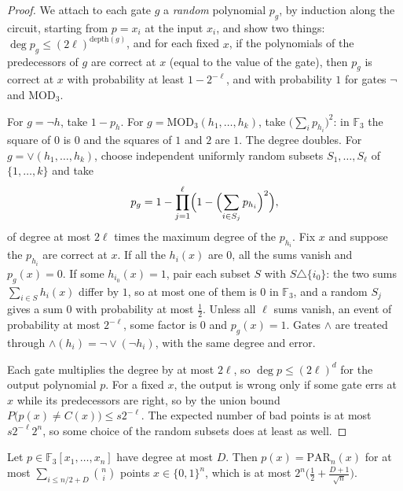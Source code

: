 \begin{proof}
We attach to each gate $g$ a \emph{random} polynomial $p_g$, by induction along the circuit, starting from $p=x_i$ at the input $x_i$, and show two things: $\deg p_g\le(2\ell)^{\mathrm{depth}(g)}$, and for each fixed $x$, if the polynomials of the predecessors of $g$ are correct at $x$ (equal to the value of the gate), then $p_g$ is correct at $x$ with probability at least $1-2^{-\ell}$, and with probability $1$ for gates $\lnot$ and $\mathrm{MOD}_3$.

For $g=\lnot h$, take $1-p_h$. For $g=\mathrm{MOD}_3(h_1,\dots,h_k)$, take $\bigl(\sum_ip_{h_i}\bigr)^2$: in $\mathbb F_3$ the square of $0$ is $0$ and the squares of $1$ and $2$ are $1$. The degree doubles. For $g=\lor(h_1,\dots,h_k)$, choose independent uniformly random subsets $S_1,\dots,S_\ell$ of $\{1,\dots,k\}$ and take
\[
p_g=1-\prod_{j=1}^{\ell}\Bigl(1-\Bigl(\sum_{i\in S_j}p_{h_i}\Bigr)^2\Bigr),
\]
of degree at most $2\ell$ times the maximum degree of the $p_{h_i}$. Fix $x$ and suppose the $p_{h_i}$ are correct at $x$. If all the $h_i(x)$ are $0$, all the sums vanish and $p_g(x)=0$. If some $h_{i_0}(x)=1$, pair each subset $S$ with $S\triangle\{i_0\}$: the two sums $\sum_{i\in S}h_i(x)$ differ by $1$, so at most one of them is $0$ in $\mathbb F_3$, and a random $S_j$ gives a sum $0$ with probability at most $\frac12$. Unless all $\ell$ sums vanish, an event of probability at most $2^{-\ell}$, some factor is $0$ and $p_g(x)=1$. Gates $\land$ are treated through $\land(h_i)=\lnot\lor(\lnot h_i)$, with the same degree and error.

Each gate multiplies the degree by at most $2\ell$, so $\deg p\le(2\ell)^d$ for the output polynomial $p$. For a fixed $x$, the output is wrong only if some gate errs at $x$ while its predecessors are right, so by the union bound $P\bigl(p(x)\ne C(x)\bigr)\le s2^{-\ell}$. The expected number of bad points is at most $s2^{-\ell}2^n$, so some choice of the random subsets does at least as well.
\end{proof}

\begin{lemma}\label{lem:parityfar}
Let $p\in\mathbb F_3[x_1,\dots,x_n]$ have degree at most $D$. Then $p(x)=\mathrm{PAR}_n(x)$ for at most $\sum_{i\le n/2+D}\binom ni$ points $x\in\{0,1\}^n$, which is at most $2^n\bigl(\frac12+\frac{D+1}{\sqrt n}\bigr)$.
\end{lemma}

